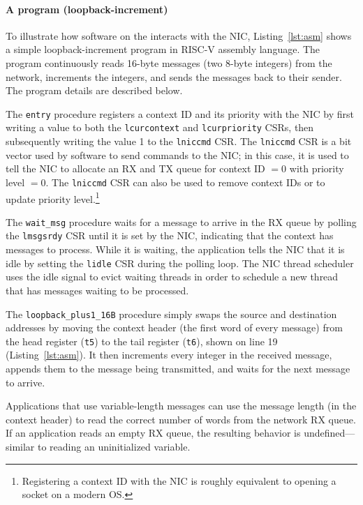 \paragraph{A \name{} program (loopback-increment)}
To illustrate how software on the \name{} interacts with the NIC, Listing~\ref{lst:asm} shows a simple loopback-increment program in RISC-V assembly language.
The program continuously reads 16-byte messages (two 8-byte integers) from the network, increments the integers, and sends the messages back to their sender.
The program details are described below.

The \verb|entry| procedure registers a context ID and its priority with the NIC by first writing a value to both the \verb|lcurcontext| and \verb|lcurpriority| CSRs, then subsequently writing the value 1 to the \verb|lniccmd| CSR.
The \verb|lniccmd| CSR is a bit vector used by software to send commands to the NIC; in this case, it is used to tell the NIC to allocate an RX and TX queue for context ID $=0$ with priority level $=0$.
The \verb|lniccmd| CSR can also be used to remove context IDs or to update priority level.\footnote{Registering a context ID with the NIC is roughly equivalent to opening a socket on a modern OS.}

The \verb|wait_msg| procedure waits for a message to arrive in the RX queue by polling the \verb|lmsgsrdy| CSR until it is set by the NIC, indicating that the context has messages to process.
While it is waiting, the application tells the NIC that it is idle by setting the \verb|lidle| CSR during the polling loop.
The NIC thread scheduler uses the idle signal to evict waiting threads in order to schedule a new thread that has messages waiting to be processed.

The \verb|loopback_plus1_16B| procedure simply swaps the source and destination addresses by moving the context header (the first word of every message) from the head register (\verb|t5|) to the tail register (\verb|t6|), shown on line 19 (Listing~\ref{lst:asm}). 
It then increments every integer in the received message, appends them to the message being transmitted, and waits for the next message to arrive.

Applications that use variable-length messages can use the message length (in the context header) to read the correct number of words from the network RX queue.
If an application reads an empty RX queue, the resulting behavior is undefined---similar to reading an uninitialized variable.
